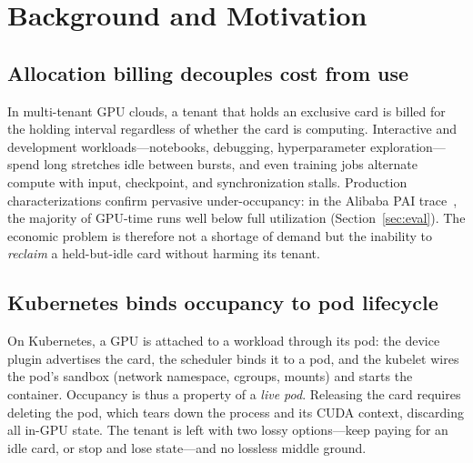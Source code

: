 \documentclass[preprint,12pt]{elsarticle}
\begin{document}
\section{Background and Motivation}
\label{sec:motivation}

\subsection{Allocation billing decouples cost from use}
In multi-tenant GPU clouds, a tenant that holds an exclusive card is billed for the holding interval
regardless of whether the card is computing. Interactive and development workloads---notebooks, debugging,
hyperparameter exploration---spend long stretches idle between bursts, and even training jobs alternate
compute with input, checkpoint, and synchronization stalls. Production characterizations confirm pervasive
under-occupancy: in the Alibaba PAI trace~\cite{mlaas}, the majority of GPU-time runs well below full
utilization (Section~\ref{sec:eval}). The economic problem is therefore not a shortage of demand but the
inability to \emph{reclaim} a held-but-idle card without harming its tenant.

\subsection{Kubernetes binds occupancy to pod lifecycle}
On Kubernetes, a GPU is attached to a workload through its pod: the device plugin advertises the card, the
scheduler binds it to a pod, and the kubelet wires the pod's sandbox (network namespace, cgroups, mounts)
and starts the container. Occupancy is thus a property of a \emph{live pod}. Releasing the card requires
deleting the pod, which tears down the process and its CUDA context, discarding all in-GPU state. The
tenant is left with two lossy options---keep paying for an idle card, or stop and lose state---and no
lossless middle ground.
\end{document}
